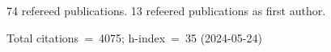 74 refereed publications. 13 refeered publications as first author.

Total citations~=~4075; h-index~=~35 (2024-05-24)